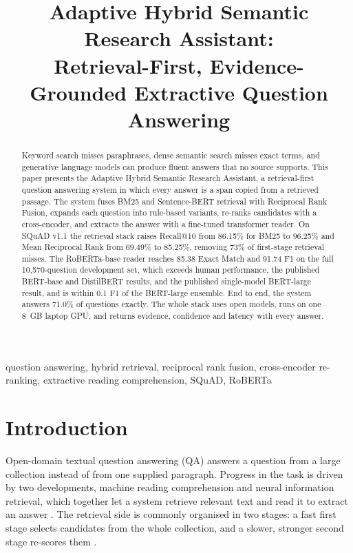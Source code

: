\documentclass[conference]{IEEEtran}
\begin{document}
\title{Adaptive Hybrid Semantic Research Assistant:\\
Retrieval-First, Evidence-Grounded Extractive Question Answering}

\author{
}

\maketitle

\begin{abstract}
Keyword search misses paraphrases, dense semantic search misses exact terms, and generative
language models can produce fluent answers that no source supports. This paper presents the
Adaptive Hybrid Semantic Research Assistant, a retrieval-first question answering system in
which every answer is a span copied from a retrieved passage. The system fuses BM25 and
Sentence-BERT retrieval with Reciprocal Rank Fusion, expands each question into rule-based
variants, re-ranks candidates with a cross-encoder, and extracts the answer with a fine-tuned
transformer reader. On SQuAD v1.1 the retrieval stack raises Recall@10 from 86.15\% for BM25 to
96.25\% and Mean Reciprocal Rank from 69.49\% to 85.25\%, removing 73\% of first-stage retrieval
misses. The RoBERTa-base reader reaches 85.38 Exact Match and 91.74 F1 on the full
10,570-question development set, which exceeds human performance, the published BERT-base and
DistilBERT results, and the published single-model BERT-large result, and is within 0.1 F1 of the
BERT-large ensemble. End to end, the system answers 71.0\% of questions exactly. The whole stack
uses open models, runs on one 8~GB laptop GPU, and returns evidence, confidence and latency with
every answer.
\end{abstract}

\begin{IEEEkeywords}
question answering, hybrid retrieval, reciprocal rank fusion, cross-encoder re-ranking,
extractive reading comprehension, SQuAD, RoBERTa
\end{IEEEkeywords}

\section{Introduction}

Open-domain textual question answering (QA) answers a question from a large collection instead of
from one supplied paragraph. Progress in the task is driven by two developments, machine reading
comprehension and neural information retrieval, which together let a system retrieve relevant
text and read it to extract an answer \cite{huang2020}. The retrieval side is commonly organised
in two stages: a fast first stage selects candidates from the whole collection, and a slower,
stronger second stage re-scores them \cite{hambarde2023}.
\end{document}

